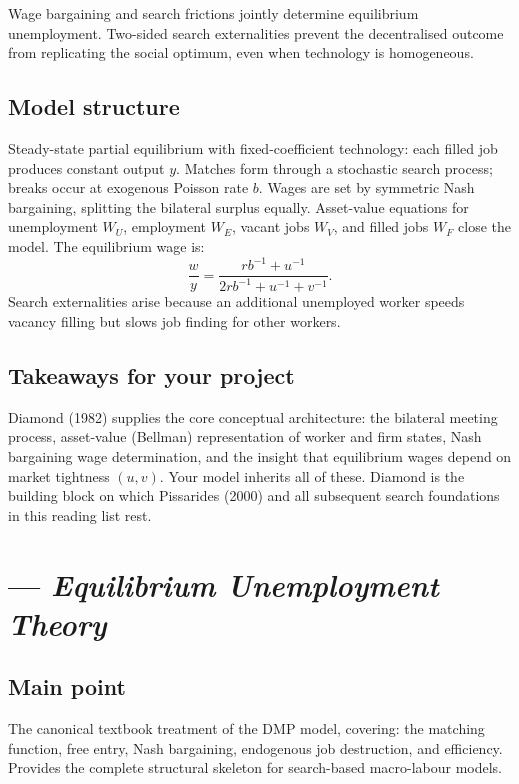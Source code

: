 \documentclass[12pt]{article}
\begin{document}
Wage bargaining and search frictions jointly determine equilibrium unemployment. Two-sided search externalities prevent the decentralised outcome from replicating the social optimum, even when technology is homogeneous.

\subsection*{Model structure}

Steady-state partial equilibrium with fixed-coefficient technology: each filled job produces constant output $y$. Matches form through a stochastic search process; breaks occur at exogenous Poisson rate $b$. Wages are set by symmetric Nash bargaining, splitting the bilateral surplus equally. Asset-value equations for unemployment $W_U$, employment $W_E$, vacant jobs $W_V$, and filled jobs $W_F$ close the model. The equilibrium wage is:
\[
\frac{w}{y} = \frac{rb^{-1} + u^{-1}}{2rb^{-1} + u^{-1} + v^{-1}}.
\]
Search externalities arise because an additional unemployed worker speeds vacancy filling but slows job finding for other workers.

\subsection*{Takeaways for your project}

Diamond (1982) supplies the core conceptual architecture: the bilateral meeting process, asset-value (Bellman) representation of worker and firm states, Nash bargaining wage determination, and the insight that equilibrium wages depend on market tightness $(u,v)$. Your model inherits all of these. Diamond is the building block on which Pissarides (2000) and all subsequent search foundations in this reading list rest.


\section{\citet{Pissarides2000} --- \emph{Equilibrium Unemployment Theory}}

\subsection*{Main point}

The canonical textbook treatment of the DMP model, covering: the matching function, free entry, Nash bargaining, endogenous job destruction, and efficiency. Provides the complete structural skeleton for search-based macro-labour models.
\end{document}
